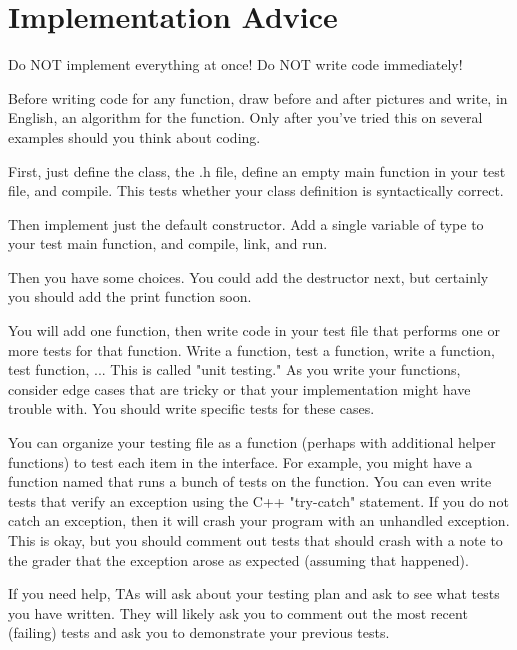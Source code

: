 \documentclass[11pt]{report}
\begin{document}
\section*{Implementation Advice}

Do NOT implement everything at once!\newline
Do NOT write code immediately!\newline

\noindent Before writing code for any function, draw before and after pictures
    and write, in English, an algorithm for the function.  Only after
    you've tried this on several examples should you think about coding.

First, just define the class,  the .h file, define an empty
    main function in your test file, and compile.  This tests whether your
    class definition is syntactically correct.

Then implement just the default constructor.  Add a single variable of
    type  to your test main function, and compile, link, and
    run.

    Then you have some choices.  You could add the destructor next, but
    certainly you should add the print function soon.

    You will add one function, then write code in your test file that
    performs one or more tests for that function.  Write a function, test a
    function, write a function, test function, ...  This is called "unit
    testing."  As you write your functions, consider edge cases that are
    tricky or that your implementation might have trouble with.  You should
    write specific tests for these cases.

    You can organize your testing file as a function (perhaps with
    additional helper functions) to test each item in the interface.  For
    example, you might have a function named  that runs a
    bunch of tests on the  function.  You can even write tests that
    verify an exception using the C++ "try-catch" statement.  If you do not
    catch an exception, then it will crash your program with an unhandled
    exception.  This is okay, but you should comment out tests that should
    crash with a note to the grader that the exception arose as expected
    (assuming that happened).

    If you need help, TAs will ask about your testing plan and ask to see
    what tests you have written.  They will likely ask you to comment out
    the most recent (failing) tests and ask you to demonstrate your
    previous tests.
\end{document}
